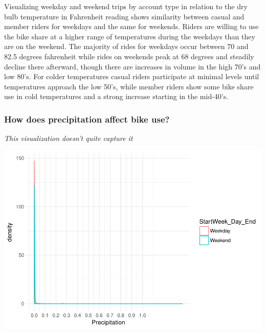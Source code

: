 \documentclass[]{article}
\newenvironment{Shaded}{\begin{snugshade}}{\end{snugshade}}
\newcommand{\KeywordTok}[1]{\textcolor[rgb]{0.13,0.29,0.53}{\textbf{#1}}}
\newcommand{\DataTypeTok}[1]{\textcolor[rgb]{0.13,0.29,0.53}{#1}}
\newcommand{\DecValTok}[1]{\textcolor[rgb]{0.00,0.00,0.81}{#1}}
\newcommand{\FloatTok}[1]{\textcolor[rgb]{0.00,0.00,0.81}{#1}}
\newcommand{\StringTok}[1]{\textcolor[rgb]{0.31,0.60,0.02}{#1}}
\newcommand{\CommentTok}[1]{\textcolor[rgb]{0.56,0.35,0.01}{\textit{#1}}}
\newcommand{\OperatorTok}[1]{\textcolor[rgb]{0.81,0.36,0.00}{\textbf{#1}}}
\newcommand{\NormalTok}[1]{#1}
\begin{document}
Visualizing weekday and weekend trips by account type in relation to the
dry bulb temperature in Fahrenheit reading shows similarity between
casual and member riders for weekdays and the same for weekends. Riders
are willing to use the bike share at a higher range of temperatures
during the weekdays than they are on the weekend. The majority of rides
for weekdays occur between 70 and 82.5 degrees fahrenheit while rides on
weekends peak at 68 degrees and steadily decline there afterward, though
there are increases in volume in the high 70's and low 80's. For colder
temperatures casual riders participate at minimal levels until
temperatures approach the low 50's, while member riders show some bike
share use in cold temperatures and a strong increase starting in the
mid-40's.

\subsubsection{How does precipitation affect bike
use?}\label{how-does-precipitation-affect-bike-use}

\emph{This visualization doesn't quite capture it}

\begin{Shaded}
\end{Shaded}

\includegraphics{Nice_Ride_Project_Stat_ReportDRAFT_files/figure-latex/unnamed-chunk-12-1.pdf}
\end{document}
